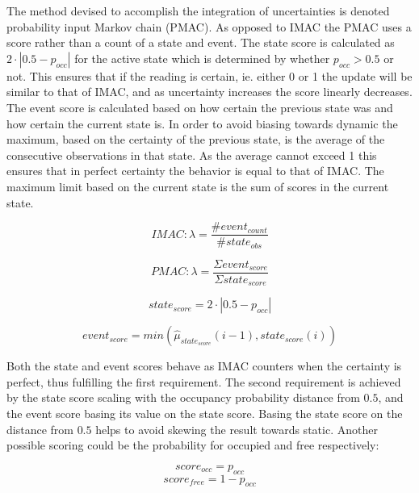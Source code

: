 The method devised to accomplish the integration of uncertainties is denoted probability input Markov chain (PMAC). As opposed to IMAC the PMAC uses a score rather than a count of a state and event. The state score is calculated as  \(2\cdot|0.5-p_{occ}|\) for the active state which is determined by whether \(p_{occ} > 0.5\) or not. This ensures that if the reading is certain, ie. either 0 or 1 the update will be similar to that of IMAC, and as uncertainty increases the score linearly decreases. The event score is calculated based on how certain the previous state was and how certain the current state is. In order to avoid biasing towards dynamic the maximum, based on the certainty of the previous state, is the average of the consecutive observations in that state. As the average cannot exceed 1 this ensures that in perfect certainty the behavior is equal to that of IMAC. The maximum limit based on the current state is the sum of scores in the current state.

\begin{equation}
IMAC: \lambda = \frac{\#event_{count}}{\#state_{obs}}
\end{equation}

\begin{equation}
PMAC: \lambda = \frac{\Sigma event_{score}}{\Sigma state_{score}}
\end{equation}

\begin{equation}
state_{score}=2 \cdot |0.5-p_{occ}| 
\end{equation}

\begin{equation}
event_{score}=min(\hat{\mu}_{state_{score}}(i-1),state_{score}(i))
\end{equation}

Both the state and event scores behave as IMAC counters when the certainty is perfect, thus fulfilling the first requirement. The second requirement is achieved by the state score scaling with the occupancy probability distance from $0.5$, and the event score basing its value on the state score. Basing the state score on the distance from $0.5$ helps to avoid skewing the result towards static. Another possible scoring could be the probability for occupied and free respectively: 

\begin{equation}
score_{occ} = p_{occ}
\end{equation}
\begin{equation}
score_{free} = 1-p_{occ}
\end{equation}

